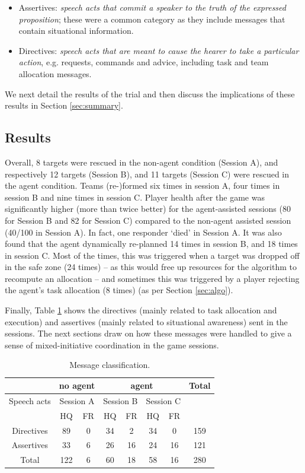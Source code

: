 \begin{itemize}
\item Assertives: \textit{speech acts that commit a speaker to the truth of the expressed proposition}; these were a common category as they include messages that contain situational information.
\item Directives: \textit{speech acts that are meant to cause the hearer to take a particular action}, e.g. requests, commands and advice, including task and team allocation messages. 
\end{itemize}
We next detail the results of the trial and then discuss the implications of these results in Section \ref{sec:summary}.

\subsection{Results}
\noindent Overall, 8 targets were rescued in the non-agent condition (Session A), and respectively 12 targets (Session B), and 11 targets (Session C) were rescued in the agent condition. Teams (re-)formed six times in session A, four times in session B and nine times  in session C. Player health after the game was significantly higher (more than twice better) for the agent-assisted sessions (80 for Session B and 82 for Session C) compared to the non-agent assisted session (40/100 in Session A). In fact, one responder `died' in Session A.
It was also found that the agent dynamically re-planned 14 times in session B, and 18 times in session C. Most of the times, this was triggered when a target was dropped off in the safe zone (24 times) -- as this would free up resources for the algorithm to recompute an allocation -- and sometimes this was triggered by a player rejecting the agent's task allocation (8 times) (as per Section \ref{sec:algo}). 

Finally, Table \ref{tab:msgs} shows the directives (mainly related to task allocation and execution) and assertives (mainly related to situational awareness) sent in the sessions. The next sections draw on how these messages were handled to give a sense of mixed-initiative coordination in the game sessions.

\begin{table}\footnotesize
\begin{tabular}{c | c c | c c c c | c}
 & \multicolumn{2}{c|}{no agent} &  \multicolumn{4}{c|}{agent} & Total \\
 \hline
 Speech acts & \multicolumn{2}{c|}{Session A} & \multicolumn{2}{c}{Session B} & \multicolumn{2}{c|}{Session C} & \\
  & HQ & FR & HQ & FR & HQ & FR & \\
  \hline
  Directives & 89 & 0 & 34 & 2 & 34 & 0 & 159 \\
  Assertives & 33 & 6 & 26 & 16 & 24 & 16 & 121 \\
  \hline
  Total & 122 & 6 & 60 & 18 & 58 & 16 & 280 \\
\end{tabular}
 \label{tab:msgs}
 \caption{Message classification.}
\end{table}


